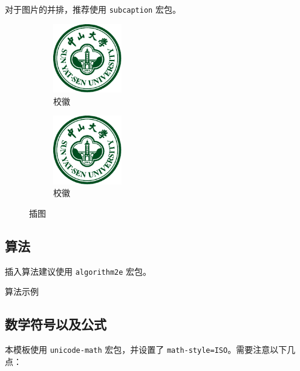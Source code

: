 对于图片的并排，推荐使用 \verb|subcaption| 宏包。

\begin{figure}[H]
    \centering
    \begin{subfigure}{3cm}
        \centering
        \includegraphics[width=3cm]{figures/sysu-badge.pdf}
        \caption{校徽}
    \end{subfigure}
    \hspace{3cm}
    \begin{subfigure}{3cm}
        \centering
        \includegraphics[width=3cm]{figures/sysu-badge.pdf}
        \caption{校徽}
    \end{subfigure}
    \caption{插图}
    \label{fig-example}
\end{figure}

\subsection{算法}

插入算法建议使用 \verb|algorithm2e| 宏包。
\vspace{.5\baselineskip}

\begin{algorithm}[H]
    \caption{算法示例}
    \label{algo:algorithm1}
\end{algorithm}

\subsection{数学符号以及公式}

本模板使用 \verb|unicode-math| 宏包，并设置了 \verb|math-style=ISO|。需要注意以下几点：

